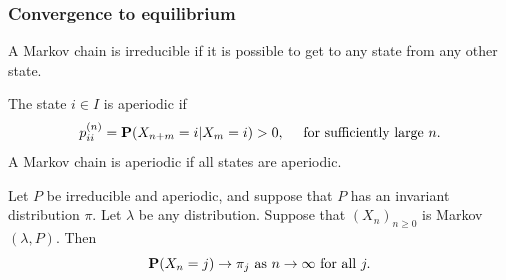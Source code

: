 \documentclass[xcolor=table,10pt]{beamer}
\begin{document}
\begin{frame}
  \frametitle{Convergence to equilibrium}

  \begin{definition}
    A Markov chain is \alert{irreducible} if it is possible to get to
    any state from any other state. 
  \end{definition}

  \begin{definition}
    The state $i\in I$ is \alert{aperiodic} if
    \begin{equation*}
      p_{ii}^{(n)} = {\bf P}(X_{n+m}=i|X_m=i)>0, \quad\text{ for
        sufficiently large } n. 
    \end{equation*}
    A Markov chain is \alert{aperiodic} if all states are aperiodic. 
  \end{definition}
      \begin{theorem}
      Let $P$ be irreducible and aperiodic, and suppose that $P$ has
      an invariant distribution $\pi$. Let $\lambda$ be any
      distribution. Suppose that $(X_n)_{n\geq 0}$ is Markov$(\lambda,
      P)$. Then
      \begin{equation*}
        {\bf P}(X_n=j) \rightarrow\pi_j\text{ as } n\rightarrow\infty\text{
          for all } j. 
      \end{equation*}
      \vspace*{-\baselineskip}
    \end{theorem}
\end{frame}

\end{document}
